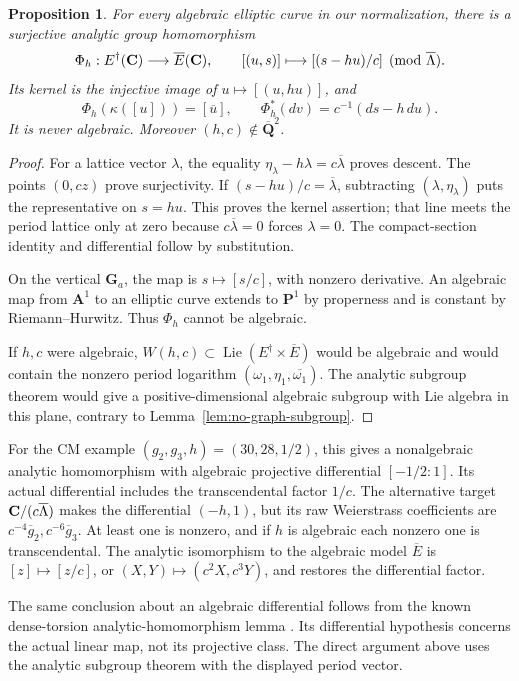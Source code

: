 \documentclass[11pt]{article}
\newtheorem{proposition}[theorem]{Proposition}
\theoremstyle{definition}\newtheorem{definition}[theorem]{Definition}
\theoremstyle{remark}\newtheorem{remark}[theorem]{Remark}
\newcommand{\Qb}{\overline{\mathbf Q}}\newcommand{\Fp}{\mathbf F_p}
\DeclareMathOperator{\Lie}{Lie}\DeclareMathOperator{\trdeg}{trdeg}
\begin{document}
\begin{proposition}\label{prop:conjugate-quotient}
For every algebraic elliptic curve in our normalization, there is a surjective analytic group homomorphism
\[
 \Phi_h:E^\dagger(\mathbf C)\longrightarrow\overline E(\mathbf C),\qquad
 [(u,s)]\longmapsto[(s-hu)/c]\pmod{\overline\Lambda}.
\]
Its kernel is the injective image of $u\mapsto[(u,hu)]$, and
\[
 \Phi_h(\kappa([u]))=[\overline u],\qquad
 \Phi_h^*(dv)=c^{-1}(ds-h\,du).
\]
It is never algebraic. Moreover $(h,c)\notin\Qb^2$.
\end{proposition}
\begin{proof}
For a lattice vector $\lambda$, the equality $\eta_\lambda-h\lambda=c\overline\lambda$ proves descent. The points $(0,cz)$ prove surjectivity. If $(s-hu)/c=\overline\lambda$, subtracting $(\lambda,\eta_\lambda)$ puts the representative on $s=hu$. This proves the kernel assertion; that line meets the period lattice only at zero because $c\overline\lambda=0$ forces $\lambda=0$. The compact-section identity and differential follow by substitution.

On the vertical $\mathbf G_a$, the map is $s\mapsto[s/c]$, with nonzero derivative. An algebraic map from $\mathbf A^1$ to an elliptic curve extends to $\mathbf P^1$ by properness and is constant by Riemann--Hurwitz. Thus $\Phi_h$ cannot be algebraic.

If $h,c$ were algebraic, $W(h,c)\subset\Lie(E^\dagger\times\overline E)$ would be algebraic and would contain the nonzero period logarithm
$(\omega_1,\eta_1,\overline{\omega_1})$. The analytic subgroup theorem would give a positive-dimensional algebraic subgroup with Lie algebra in this plane, contrary to Lemma~\ref{lem:no-graph-subgroup}.
\end{proof}

For the CM example $(g_2,g_3,h)=(30,28,1/2)$, this gives a nonalgebraic analytic homomorphism with algebraic projective differential $[-1/2:1]$. Its actual differential includes the transcendental factor $1/c$. The alternative target $\mathbf C/(c\overline\Lambda)$ makes the differential $(-h,1)$, but its raw Weierstrass coefficients are $c^{-4}\overline g_2,c^{-6}\overline g_3$. At least one is nonzero, and if $h$ is algebraic each nonzero one is transcendental. The analytic isomorphism to the algebraic model $\overline E$ is $[z]\mapsto[z/c]$, or $(X,Y)\mapsto(c^2X,c^3Y)$, and restores the differential factor.

The same conclusion about an algebraic differential follows from the known dense-torsion analytic-homomorphism lemma \cite[Lemma 6.5, printed pp.~45--46]{HuberWustholz}. Its differential hypothesis concerns the actual linear map, not its projective class. The direct argument above uses the analytic subgroup theorem with the displayed period vector.
\end{document}
